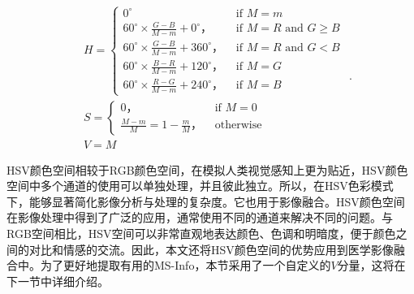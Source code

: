 \begin{equation}\label{Hcomponent}
\begin{aligned}
&H= \begin{cases}0^{\circ} & \text { if } M=m \\
60^{\circ} \times \frac{G-B}{M-m}+0^{\circ}， & \text { if } M=R \text { and } G \geq B \\
60^{\circ} \times \frac{G-B}{M-m}+360^{\circ}， & \text { if } M=R \text { and } G<B \\
60^{\circ} \times \frac{B-R}{M-m}+120^{\circ}， & \text { if } M=G \\
60^{\circ} \times \frac{R-G}{M-m}+240^{\circ}， & \text { if } M=B\end{cases} \\
&S= \begin{cases}0， & \text { if } M=0 \\
\frac{M-m}{M}=1-\frac{m}{M}， & \text { otherwise }\end{cases} \\
&V=M
\end{aligned}.
\end{equation}

HSV颜色空间相较于RGB颜色空间，在模拟人类视觉感知上更为贴近\cite{jin2018multimodal}，HSV颜色空间中多个通道的使用可以单独处理，并且彼此独立。所以，在HSV色彩模式下，能够显著简化影像分析与处理的复杂度。它也用于影像融合\cite{2018Scene}。HSV颜色空间在影像处理中得到了广泛的应用，通常使用不同的通道来解决不同的问题。与RGB空间相比，HSV空间可以非常直观地表达颜色、色调和明暗度，便于颜色之间的对比和情感的交流。因此，本文还将HSV颜色空间的优势应用到医学影像融合中。为了更好地提取有用的MS-Info，本节采用了一个自定义的$V$分量，这将在下一节中详细介绍。


